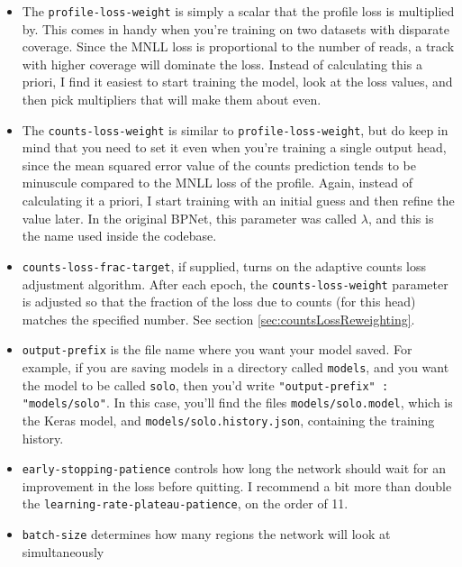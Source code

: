 \documentclass{article}
\begin{document}
\begin{itemize}
    \item The \texttt{profile-loss-weight} is simply a scalar that the profile loss is multiplied
        by. This comes in handy when you're training on two datasets with disparate coverage.
        Since the MNLL loss is proportional to the number of reads, a track with higher
        coverage will dominate the loss. Instead of calculating this a priori, I find it
        easiest to start training the model, look at the loss values, and then pick
        multipliers that will make them about even.
    \item The \texttt{counts-loss-weight} is similar to \texttt{profile-loss-weight}, but do keep
        in mind that you need to set it even when you're training a single output head, since
        the mean squared error value of the counts prediction tends to be minuscule compared
        to the MNLL loss of the profile. Again, instead of calculating it a priori, I start
        training with an initial guess and then refine the value later. In the original BPNet,
        this parameter was called $\lambda$, and this is the name used inside the codebase.
    \item \texttt{counts-loss-frac-target}, if supplied, turns on the adaptive counts loss
        adjustment algorithm. After each epoch, the \texttt{counts-loss-weight} parameter
        is adjusted so that the fraction of the loss due to counts (for this head)
        matches the specified number. See section \ref{sec:countsLossReweighting}.
    \item \begin{sloppypar}
            \texttt{output-prefix} is the file name where you want your model saved.
        For example, if you are saving models in a directory called \texttt{models}, and you
        want the model to be called \texttt{solo}, then you'd write
        \verb|"output-prefix" : "models/solo"|. In this case, you'll find the files
        \texttt{models/solo.model}, which is the Keras model, and
        \texttt{models/solo.history.json}, containing the training history.
    \end{sloppypar}
    \item \texttt{early-stopping-patience} controls how long the network should wait for an
        improvement in the loss before quitting. I recommend a bit more than double the
        \texttt{learning-rate-plateau-patience}, on the order of 11.
    \item \texttt{batch-size} determines how many regions the network will look at simultaneously

\end{itemize}
\end{document}
